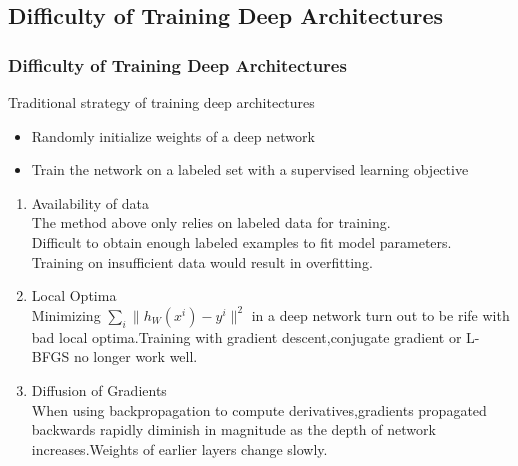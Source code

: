 \documentclass{beamer}
\begin{document}
\begin{CJK*}{UTF8}{gbsn}
\subsection{Difficulty of Training Deep Architectures}
\begin{frame}\frametitle{Difficulty of Training Deep Architectures}
\begin{block}{Traditional strategy of training deep architectures}
\begin{itemize}
\item Randomly initialize weights of a deep network
\item Train the network on a labeled set with a supervised learning objective
\end{itemize}
\end{block}
\begin{enumerate}
\item Availability of data\\
The method above only relies on labeled data for training.\\
Difficult to obtain enough labeled examples to fit model parameters.\\
Training on insufficient data would result in overfitting.
\item Local Optima\\
Minimizing $\sum_i\|h_W(x^i)-y^i\|^2$ in a deep network turn out to be rife with bad local optima.Training with gradient descent,conjugate gradient or L-BFGS no longer work well.
\item Diffusion of Gradients\\
When using backpropagation to compute derivatives,gradients propagated backwards rapidly diminish in magnitude as the depth of network increases.Weights of earlier layers change slowly.
\end{enumerate}
\end{frame}


\end{CJK*}
\end{document}
